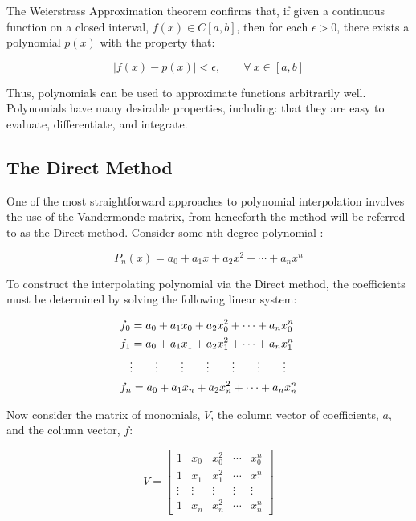 \documentclass[11pt]{article}%
\begin{document}
The Weierstrass Approximation theorem confirms that, if given a continuous function on a closed interval, $f(x) \in C[a, b]$, then for each $\epsilon > 0$, there exists a polynomial $p(x)$ with the property that:

\begin{equation}
|f(x) - p(x)| < \epsilon, \qquad \forall \ x \in [a, b]
\end{equation}

Thus, polynomials can be used to approximate functions arbitrarily well. Polynomials have many desirable properties, including: that they are easy to evaluate, differentiate, and integrate.

\subsection{The Direct Method}
One of the most straightforward approaches to polynomial interpolation involves the use of the Vandermonde matrix, from henceforth the method will be referred to as the Direct method. Consider some nth degree polynomial \cite{LHK3}:

\begin{equation}
P_n\left(x\right) = a_0 + a_1x + a_2x^2 + \cdots + a_nx^n
\end{equation}

To construct the interpolating polynomial via the Direct method, the coefficients must be determined by solving the following linear system:

\begin{equation}
\begin{split} %
&f_0 = a_0 + a_1x_0 + a_2x_0^2 + \cdots + a_nx_0^n \\
&f_1 = a_0 + a_1x_1 + a_2x_1^2 + \cdots + a_nx_1^n \\
&\hspace{0.3cm} \vdots \qquad \vdots \qquad \vdots \qquad \vdots \qquad \vdots \qquad \vdots \qquad \vdots \\
&f_n = a_0 + a_1x_n + a_2x_n^2 + \cdots + a_nx_n^n
\end{split}
\end{equation}

Now consider the matrix of monomials, $V$, the column vector of coefficients, $a$, and the column vector, $f$:

\begin{equation}
V = \begin{bmatrix}
1 & x_0 & x_0^2 & \cdots & x_0^n\\
1 & x_1 & x_1^2 & \cdots & x_1^n\\
\vdots & \vdots & \vdots & \vdots & \vdots\\
1 & x_n & x_n^2 & \cdots & x_n^n
\end{bmatrix}
\end{equation}
\end{document}
